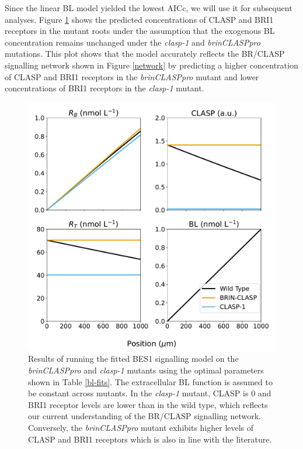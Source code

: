 \documentclass[referee,pdflatex,sn-mathphys-num]{sn-jnl}
\begin{document}
Since the linear BL model yielded the lowest AICc, we will use it for subsequent analyses.
Figure \ref{bes1-mutants} shows the predicted concentrations of CLASP and BRI1 receptors in the mutant roots under the assumption that the exogenous BL concentration remains unchanged under the \emph{clasp-1} and \emph{brinCLASPpro} mutations.
This plot shows that the model accurately reflects the BR/CLASP signalling network shown in Figure \ref{network} by predicting a higher concentration of CLASP and BRI1 receptors in the \emph{brinCLASPpro} mutant and lower concentrations of BRI1 receptors in the \emph{clasp-1} mutant.

\begin{figure}
  \centering
  \includegraphics[width=\textwidth]{bes1-mutants.pdf}
  \caption{Results of running the fitted BES1 signalling model on the \emph{brinCLASPpro} and \emph{clasp-1} mutants using the optimal parameters shown in Table \ref{bl-fits}.
    The extracellular BL function is assumed to be constant across mutants.
  In the \emph{clasp-1} mutant, CLASP is $0$ and BRI1 receptor levels are lower than in the wild type, which reflects our current understanding of the BR/CLASP signalling network.
Conversely, the \emph{brinCLASPpro} mutant exhibits higher levels of CLASP and BRI1 receptors which is also in line with the literature.}
\label{bes1-mutants}
\end{figure}
\end{document}
